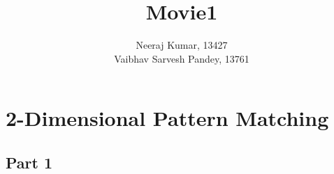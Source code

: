 \documentclass[a4paper]{article}
\title{Movie1 }
\author{Neeraj Kumar, 13427\\
	Vaibhav Sarvesh Pandey, 13761}
\begin{document}
	\maketitle
	
	
	
	\section{2-Dimensional Pattern Matching}
	
	    \subsection{Part 1}
	    	        
	        
	            
	        
	        
	        
	    
	    
	

	
	
\end{document}

